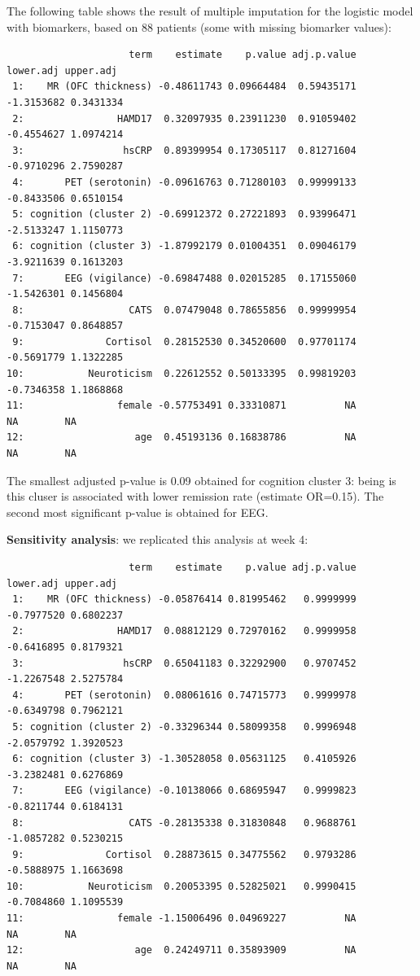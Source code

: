 \documentclass[12pt]{article}
\begin{document}
The following table shows the result of multiple imputation for the
logistic model with biomarkers, based on 88 patients (some with
missing biomarker values):
\begin{verbatim}
                     term    estimate    p.value adj.p.value  lower.adj upper.adj
 1:    MR (OFC thickness) -0.48611743 0.09664484  0.59435171 -1.3153682 0.3431334
 2:                HAMD17  0.32097935 0.23911230  0.91059402 -0.4554627 1.0974214
 3:                 hsCRP  0.89399954 0.17305117  0.81271604 -0.9710296 2.7590287
 4:       PET (serotonin) -0.09616763 0.71280103  0.99999133 -0.8433506 0.6510154
 5: cognition (cluster 2) -0.69912372 0.27221893  0.93996471 -2.5133247 1.1150773
 6: cognition (cluster 3) -1.87992179 0.01004351  0.09046179 -3.9211639 0.1613203
 7:       EEG (vigilance) -0.69847488 0.02015285  0.17155060 -1.5426301 0.1456804
 8:                  CATS  0.07479048 0.78655856  0.99999954 -0.7153047 0.8648857
 9:              Cortisol  0.28152530 0.34520600  0.97701174 -0.5691779 1.1322285
10:           Neuroticism  0.22612552 0.50133395  0.99819203 -0.7346358 1.1868868
11:                female -0.57753491 0.33310871          NA         NA        NA
12:                   age  0.45193136 0.16838786          NA         NA        NA
\end{verbatim}

The smallest adjusted p-value is 0.09 obtained for cognition cluster
3: being is this cluser is associated with lower remission rate
(estimate OR=0.15). The second most significant p-value is obtained for EEG.


\clearpage

\textbf{Sensitivity analysis}: we replicated this analysis at week 4:
\begin{verbatim}
                     term    estimate    p.value adj.p.value  lower.adj upper.adj
 1:    MR (OFC thickness) -0.05876414 0.81995462   0.9999999 -0.7977520 0.6802237
 2:                HAMD17  0.08812129 0.72970162   0.9999958 -0.6416895 0.8179321
 3:                 hsCRP  0.65041183 0.32292900   0.9707452 -1.2267548 2.5275784
 4:       PET (serotonin)  0.08061616 0.74715773   0.9999978 -0.6349798 0.7962121
 5: cognition (cluster 2) -0.33296344 0.58099358   0.9996948 -2.0579792 1.3920523
 6: cognition (cluster 3) -1.30528058 0.05631125   0.4105926 -3.2382481 0.6276869
 7:       EEG (vigilance) -0.10138066 0.68695947   0.9999823 -0.8211744 0.6184131
 8:                  CATS -0.28135338 0.31830848   0.9688761 -1.0857282 0.5230215
 9:              Cortisol  0.28873615 0.34775562   0.9793286 -0.5888975 1.1663698
10:           Neuroticism  0.20053395 0.52825021   0.9990415 -0.7084860 1.1095539
11:                female -1.15006496 0.04969227          NA         NA        NA
12:                   age  0.24249711 0.35893909          NA         NA        NA
\end{verbatim}
\end{document}
